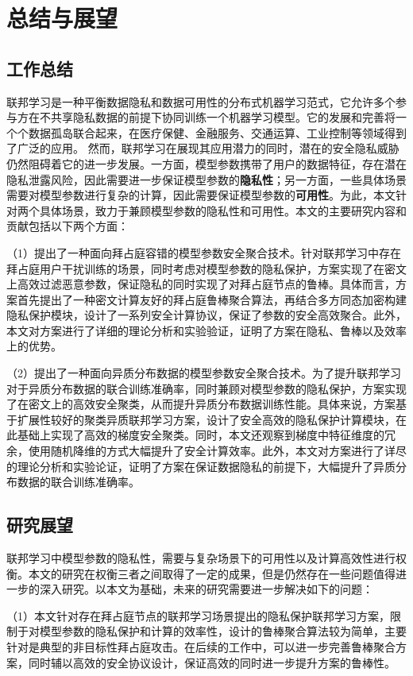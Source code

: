 \chapter{总结与展望}
\section{工作总结}
联邦学习是一种平衡数据隐私和数据可用性的分布式机器学习范式，它允许多个参与方在不共享隐私数据的前提下协同训练一个机器学习模型。它的发展和完善将一个个数据孤岛联合起来，在医疗保健、金融服务、交通运算、工业控制等领域得到了广泛的应用。
然而，联邦学习在展现其应用潜力的同时，潜在的安全隐私威胁仍然阻碍着它的进一步发展。一方面，模型参数携带了用户的数据特征，存在潜在隐私泄露风险，因此需要进一步保证模型参数的\textbf{隐私性}；另一方面，一些具体场景需要对模型参数进行复杂的计算，因此需要保证模型参数的\textbf{可用性}。为此，本文针对两个具体场景，致力于兼顾模型参数的隐私性和可用性。本文的主要研究内容和贡献包括以下两个方面：

（1）提出了一种面向拜占庭容错的模型参数安全聚合技术。针对联邦学习中存在拜占庭用户干扰训练的场景，同时考虑对模型参数的隐私保护，方案实现了在密文上高效过滤恶意参数，保证隐私的同时实现了对拜占庭节点的鲁棒。具体而言，方案首先提出了一种密文计算友好的拜占庭鲁棒聚合算法，再结合多方同态加密构建隐私保护模块，设计了一系列安全计算协议，保证了参数的安全高效聚合。此外，本文对方案进行了详细的理论分析和实验验证，证明了方案在隐私、鲁棒以及效率上的优势。

（2）提出了一种面向异质分布数据的模型参数安全聚合技术。为了提升联邦学习对于异质分布数据的联合训练准确率，同时兼顾对模型参数的隐私保护，方案实现了在密文上的高效安全聚类，从而提升异质分布数据训练性能。具体来说，方案基于扩展性较好的聚类异质联邦学习方案，设计了安全高效的隐私保护计算模块，在此基础上实现了高效的梯度安全聚类。同时，本文还观察到梯度中特征维度的冗余，使用随机降维的方式大幅提升了安全计算效率。此外，本文对方案进行了详尽的理论分析和实验论证，证明了方案在保证数据隐私的前提下，大幅提升了异质分布数据的联合训练准确率。

\section{研究展望}
联邦学习中模型参数的隐私性，需要与复杂场景下的可用性以及计算高效性进行权衡。本文的研究在权衡三者之间取得了一定的成果，但是仍然存在一些问题值得进一步的深入研究。以本文为基础，未来的研究需要进一步解决如下的问题：

（1）本文针对存在拜占庭节点的联邦学习场景提出的隐私保护联邦学习方案，限制于对模型参数的隐私保护和计算的效率性，设计的鲁棒聚合算法较为简单，主要针对是典型的非目标性拜占庭攻击。在后续的工作中，可以进一步完善鲁棒聚合方案，同时辅以高效的安全协议设计，保证高效的同时进一步提升方案的鲁棒性。

